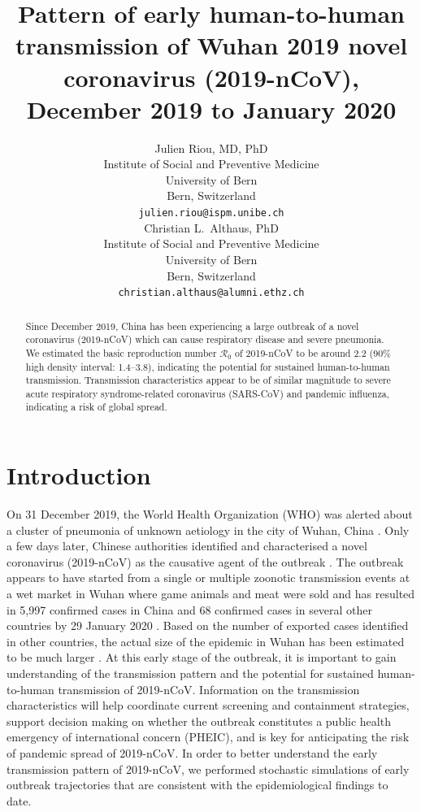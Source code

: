 \documentclass{article}
\title{Pattern of early human-to-human transmission of Wuhan 2019 novel coronavirus (2019-nCoV), December 2019 to January 2020}
\author{
   Julien Riou, MD, PhD \\
  Institute of Social and Preventive Medicine\\
  University of Bern\\
  Bern, Switzerland \\
  \texttt{julien.riou@ispm.unibe.ch} \\
  \And
Christian L.~Althaus, PhD \\
Institute of Social and Preventive Medicine\\
University of Bern\\
Bern, Switzerland \\
\texttt{christian.althaus@alumni.ethz.ch}
}
\begin{document}
\maketitle

\begin{abstract}
Since December 2019, China has been experiencing a large outbreak of a novel coronavirus (2019-nCoV) which can cause respiratory disease and severe pneumonia. We estimated the basic reproduction number $\mathcal{R}_0$ of 2019-nCoV to be around 2.2 (90\% high density interval: 1.4–3.8), indicating the potential for sustained human-to-human transmission. Transmission characteristics appear to be of similar magnitude to severe acute respiratory syndrome-related coronavirus (SARS-CoV) and pandemic influenza, indicating a risk of global spread.
\end{abstract}

\section*{Introduction}

On 31 December 2019, the World Health Organization (WHO) was alerted about a cluster of pneumonia of unknown aetiology in the city of Wuhan, China \cite{who1,huang2020clinical}. Only a few days later, Chinese authorities identified and characterised a novel coronavirus (2019-nCoV) as the causative agent of the outbreak \cite{Shi:2020}. The outbreak appears to have started from a single or multiple zoonotic transmission events at a wet market in Wuhan where game animals and meat were sold \cite{chan2020familial} and has resulted in 5,997 confirmed cases in China and 68 confirmed cases in several other countries by 29 January 2020 \cite{who2}. Based on the number of exported cases identified in other countries, the actual size of the epidemic in Wuhan has been estimated to be much larger \cite{Imai:2020}. At this early stage of the outbreak, it is important to gain understanding of the transmission pattern and the potential for sustained human-to-human transmission of 2019-nCoV. Information on the transmission characteristics will help coordinate current screening and containment strategies, support decision making on whether the outbreak constitutes a public health emergency of international concern (PHEIC), and is key for anticipating the risk of pandemic spread of 2019-nCoV. In order to better understand the early transmission pattern of 2019-nCoV, we performed stochastic simulations of early outbreak trajectories that are consistent with the epidemiological findings to date.
\end{document}
